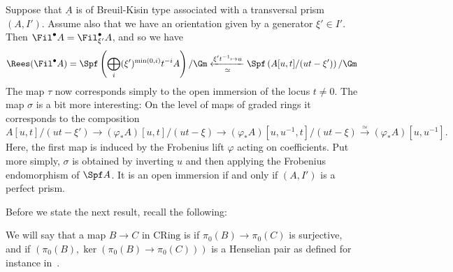 \documentclass[10pt]{amsart}
\begin{document}
\begin{example}
\label{ex:stacks_in_bk_case}
Suppose that $\underline{A}$ is of Breuil-Kisin type associated with a transversal prism $(A,I')$. Assume also that we have an orientation given by a generator $\xi'\in I'$. Then $\Fil^\bullet A = \Fil^\bullet_{\xi'}A$, and so we have
\[
\Rees(\Fil^\bullet A) = \Spf\left(\bigoplus_i(\xi')^{\min(0,i)}t^{-i}A\right)/\Gm \xleftarrow[\simeq]{\xi't^{-1}\mapsto u}\Spf\left(A[u,t]/(ut-\xi')\right)/\Gm
\]
The map $\tau$ now corresponds simply to the open immersion of the locus $t\neq 0$. The map $\sigma$ is a bit more interesting: On the level of maps of graded rings it corresponds to the composition
\[
A[u,t]/(ut-\xi')\to (\varphi_*A)[u,t]/(ut-\xi)\to (\varphi_*A)[u,u^{-1},t]/(ut-\xi)\xrightarrow{\simeq}(\varphi_*A)[u,u^{-1}].
\]
Here, the first map is induced by the Frobenius lift $\varphi$ acting on coefficients. Put more simply, $\sigma$ is obtained by inverting $u$ and then applying the Frobenius endomorphism of $\Spf A$. It is an open immersion if and only if $(A,I')$ is a perfect prism.
\end{example}


Before we state the next result, recall the following:
\begin{definition}
We will say that a map $B\to C$ in $\mathrm{CRing}$ is  if $\pi_0(B)\to \pi_0(C)$ is surjective, and if $(\pi_0(B),\ker(\pi_0(B)\to\pi_0(C)))$ is a Henselian pair as defined for instance in~\cite[\href{https://stacks.math.columbia.edu/tag/09XD}{Tag 09XD}]{stacks-project}.
\end{definition}
\end{document}
